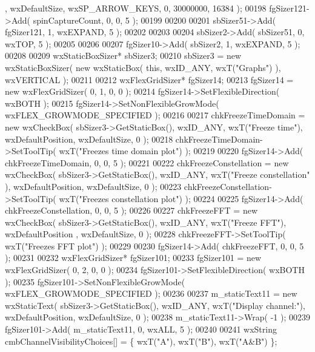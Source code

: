 \begin{DoxyCode}
      , wxDefaultSize, wxSP\_ARROW\_KEYS, 0, 30000000, 16384 );
00198     fgSizer121->Add( spinCaptureCount, 0, 0, 5 );
00199     
00200     
00201     sbSizer51->Add( fgSizer121, 1, wxEXPAND, 5 );
00202     
00203     
00204     sbSizer2->Add( sbSizer51, 0, wxTOP, 5 );
00205     
00206     
00207     fgSizer10->Add( sbSizer2, 1, wxEXPAND, 5 );
00208     
00209     wxStaticBoxSizer* sbSizer3;
00210     sbSizer3 = \textcolor{keyword}{new} wxStaticBoxSizer( \textcolor{keyword}{new} wxStaticBox( \textcolor{keyword}{this}, wxID\_ANY, wxT(\textcolor{stringliteral}{"Graphs"}) ), wxVERTICAL );
00211     
00212     wxFlexGridSizer* fgSizer14;
00213     fgSizer14 = \textcolor{keyword}{new} wxFlexGridSizer( 0, 1, 0, 0 );
00214     fgSizer14->SetFlexibleDirection( wxBOTH );
00215     fgSizer14->SetNonFlexibleGrowMode( wxFLEX\_GROWMODE\_SPECIFIED );
00216     
00217     chkFreezeTimeDomain = \textcolor{keyword}{new} wxCheckBox( sbSizer3->GetStaticBox(), wxID\_ANY, wxT(\textcolor{stringliteral}{"Freeze time"}), 
      wxDefaultPosition, wxDefaultSize, 0 );
00218     chkFreezeTimeDomain->SetToolTip( wxT(\textcolor{stringliteral}{"Freezes time domain plot"}) );
00219     
00220     fgSizer14->Add( chkFreezeTimeDomain, 0, 0, 5 );
00221     
00222     chkFreezeConstellation = \textcolor{keyword}{new} wxCheckBox( sbSizer3->GetStaticBox(), wxID\_ANY, wxT(\textcolor{stringliteral}{"Freeze constellation"}
      ), wxDefaultPosition, wxDefaultSize, 0 );
00223     chkFreezeConstellation->SetToolTip( wxT(\textcolor{stringliteral}{"Freezes constellation plot"}) );
00224     
00225     fgSizer14->Add( chkFreezeConstellation, 0, 0, 5 );
00226     
00227     chkFreezeFFT = \textcolor{keyword}{new} wxCheckBox( sbSizer3->GetStaticBox(), wxID\_ANY, wxT(\textcolor{stringliteral}{"Freeze FFT"}), wxDefaultPosition
      , wxDefaultSize, 0 );
00228     chkFreezeFFT->SetToolTip( wxT(\textcolor{stringliteral}{"Freezes FFT plot"}) );
00229     
00230     fgSizer14->Add( chkFreezeFFT, 0, 0, 5 );
00231     
00232     wxFlexGridSizer* fgSizer101;
00233     fgSizer101 = \textcolor{keyword}{new} wxFlexGridSizer( 0, 2, 0, 0 );
00234     fgSizer101->SetFlexibleDirection( wxBOTH );
00235     fgSizer101->SetNonFlexibleGrowMode( wxFLEX\_GROWMODE\_SPECIFIED );
00236     
00237     m_staticText11 = \textcolor{keyword}{new} wxStaticText( sbSizer3->GetStaticBox(), wxID\_ANY, wxT(\textcolor{stringliteral}{"Display channel:"}), 
      wxDefaultPosition, wxDefaultSize, 0 );
00238     m_staticText11->Wrap( -1 );
00239     fgSizer101->Add( m_staticText11, 0, wxALL, 5 );
00240     
00241     wxString cmbChannelVisibilityChoices[] = \{ wxT(\textcolor{stringliteral}{"A"}), wxT(\textcolor{stringliteral}{"B"}), wxT(\textcolor{stringliteral}{"A&B"}) \};

\end{DoxyCode}
